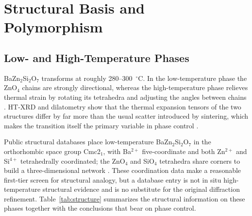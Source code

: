 \section{Structural Basis and Polymorphism}

\subsection{Low- and High-Temperature Phases}

BaZn$_2$Si$_2$O$_7$ transforms at roughly 280--300~$^\circ$C. In the low-temperature phase the ZnO$_4$ chains are strongly directional, whereas the high-temperature phase relieves thermal strain by rotating its tetrahedra and adjusting the angles between chains \cite{lin1999phase,thieme2015ba1}. HT\nobreakdash-XRD and dilatometry show that the thermal expansion tensors of the two structures differ by far more than the usual scatter introduced by sintering, which makes the transition itself the primary variable in phase control \cite{kerstan2012thermal,thieme2016very}.

Public structural databases place low-temperature BaZn$_2$Si$_2$O$_7$ in the orthorhombic space group Cmc2$_1$, with Ba$^{2+}$ five-coordinate and both Zn$^{2+}$ and Si$^{4+}$ tetrahedrally coordinated; the ZnO$_4$ and SiO$_4$ tetrahedra share corners to build a three-dimensional network \cite{available2020materials}. These coordination data make a reasonable first-tier screen for structural analogy, but a database entry is not in situ high-temperature structural evidence and is no substitute for the original diffraction refinement. Table~\ref{tab:structure} summarizes the structural information on these phases together with the conclusions that bear on phase control.

